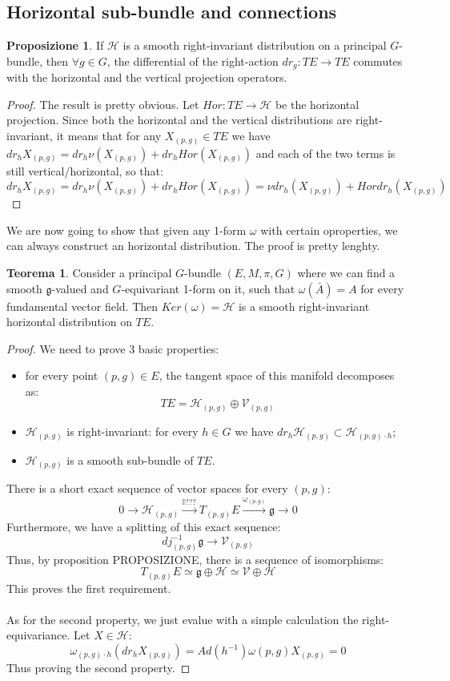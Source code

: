 \documentclass[12pt,a4paper]{report}
\theoremstyle{definition}
\theoremstyle{Theorem}
\newtheorem{Theo}[Def]{Teorema}
\newtheorem{Prop}[Def]{Proposizione}
\theoremstyle{definition}
\theoremstyle{definition}
\theoremstyle{definition}
\begin{document}
	\subsection{Horizontal sub-bundle and connections}
	\begin{Prop}
		If $\mathcal{H}$ is a smooth right-invariant distribution on a principal $G$-bundle, then $\forall g\in G$, the differential of the right-action $dr_g:TE\rightarrow TE$ commutes with the horizontal and the vertical projection operators.
	\end{Prop}
	\begin{proof}
		The result is pretty obvious. Let $Hor:TE\rightarrow\mathcal{H}$ be the horizontal projection. Since both the horizontal and the vertical distributions are right-invariant, it means that for any $X_{(p,g)}\in TE$ we have $dr_h X_{(p,g)}=dr_h \nu(X_{(p,g)})+dr_hHor(X_{(p,g)})$ and each of the two terms is still vertical/horizontal, so that:
		$$dr_h X_{(p,g)}=dr_h \nu(X_{(p,g)})+dr_hHor(X_{(p,g)})=
		\nu dr_h(X_{(p,g)})+Hordr_h(X_{(p,g)})$$
	\end{proof}
	We are now going to show that given any 1-form $\omega$ with certain oproperties, we can always construct an horizontal distribution. The proof is pretty lenghty.
	\begin{Theo}
		Consider a principal $G$-bundle $(E,M,\pi,G)$ where we can find a smooth $\mathfrak{g}$-valued and $G$-equivariant 1-form on it, such that $\omega(\bar{A})=A$ for every fundamental vector field. Then $Ker(\omega)=\mathcal{H}$ is a smooth right-invariant horizontal distribution on $TE$.
	\end{Theo}
	\begin{proof}
		We need to prove 3 basic properties:
		\begin{itemize}
			\item for every point $(p,g)\in E$, the tangent space of this manifold decomposes as:
			$$TE=\mathcal{H}_{(p,g)}\oplus \mathcal{V}_{(p,g)}$$
			\item $\mathcal{H}_{(p,g)}$ is right-invariant: for every $h\in G$ we have $dr_h \mathcal{H}_{(p,g)}\subset \mathcal{H}_{(p,g)\cdot h}$;
			\item $\mathcal{H}_{(p,g)}$ is a smooth sub-bundle of $TE$.
		\end{itemize}
		There is a short exact sequence of vector spaces for every $(p,g)$:
		$$0\rightarrow \mathcal{H}_{(p,g)}\xrightarrow{\mathbb{I}???} T_{(p,g)}E\xrightarrow{\omega_{(p,g)}} \mathfrak{g}\rightarrow0$$
		Furthermore, we have a splitting of this exact sequence: 
		$$dj_{(p,g)}^{-1}\mathfrak{g}\rightarrow \mathcal{V}_{(p,g)}$$
		Thus, by proposition PROPOSIZIONE, there is a sequence of isomorphisms:
		$$T_{(p,g)}E\simeq\mathfrak{g}\oplus\mathcal{H}\simeq\mathcal{V}\oplus\mathcal{H}$$
		This proves the first requirement.\\
		\\
		As for the second property, we just evalue with a simple calculation the right-equivariance. Let $X\in\mathcal{H}$:
		$$\omega_{(p,g)\cdot h}(dr_hX_{(p,g)})=Ad(h^{-1})\omega{(p,g)}X_{(p,g)}=0$$ 
		Thus proving the second property.
	\end{proof}
\end{document}
